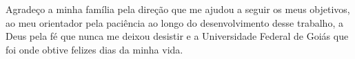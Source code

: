 \begin{agradecimentos}
 Agradeço a minha família pela direção que me ajudou a seguir os meus objetivos, ao meu orientador pela paciência ao longo do desenvolvimento desse trabalho, a Deus pela fé que nunca me deixou desistir e a Universidade Federal de Goiás que foi onde obtive felizes dias da minha vida.
\end{agradecimentos}



